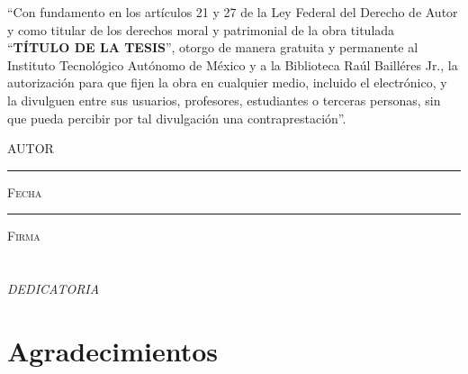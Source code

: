 \documentclass[11pt]{book}
\begin{document}

\thispagestyle{empty}
\vspace*{\fill}
\begingroup
``Con fundamento en los artículos 21 y 27 de la Ley Federal del Derecho de Autor y como titular de los derechos moral y patrimonial de la obra titulada ``\textbf{TÍTULO DE LA TESIS}'', otorgo de manera gratuita y permanente al Instituto Tecnológico Autónomo de México y a la Biblioteca Raúl Bailléres Jr., la autorización para que fijen la obra en cualquier medio, incluido el electrónico, y la divulguen entre sus usuarios, profesores, estudiantes o terceras personas, sin que pueda percibir por tal divulgación una contraprestación''.

\centering

\hspace{3em}

\textsc{AUTOR}

\vspace{5em}

\rule[1em]{20em}{0.5pt} %

\textsc{Fecha}
 
\vspace{8em}

\rule[1em]{20em}{0.5pt} %

\textsc{Firma}

\endgroup
\vspace*{\fill}



\pagestyle{empty}
\frontmatter

\chapter*{}
\begin{flushright}
\textit{DEDICATORIA}
\end{flushright}



\chapter*{Agradecimientos}
\end{document}
